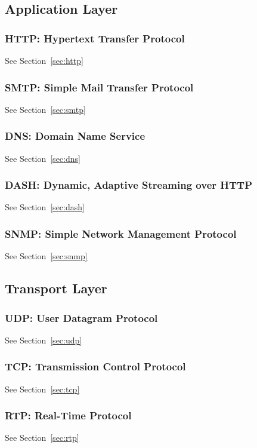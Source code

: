 \subsection{Application Layer}
\subsubsection{HTTP: Hypertext Transfer Protocol}
See Section~\ref{sec:http}
\subsubsection{SMTP: Simple Mail Transfer Protocol}
See Section~\ref{sec:smtp}
\subsubsection{DNS: Domain Name Service}
See Section~\ref{sec:dns}
\subsubsection{DASH: Dynamic, Adaptive Streaming over HTTP}
See Section~\ref{sec:dash}
\subsubsection{SNMP: Simple Network Management Protocol}
See Section~\ref{sec:snmp}


\subsection{Transport Layer}
\subsubsection{UDP: User Datagram Protocol}
See Section~\ref{sec:udp}
\subsubsection{TCP: Transmission Control Protocol}
See Section~\ref{sec:tcp}
\subsubsection{RTP: Real-Time Protocol}
See Section~\ref{sec:rtp}
